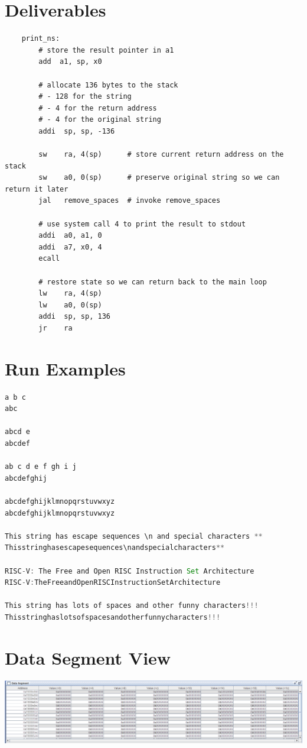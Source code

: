 \documentclass{article}
\begin{document}
\break
\section{Deliverables}
    \begin{lstlisting}
    print_ns:
        # store the result pointer in a1
        add  a1, sp, x0

        # allocate 136 bytes to the stack
        # - 128 for the string
        # - 4 for the return address
        # - 4 for the original string
        addi  sp, sp, -136

        sw    ra, 4(sp)      # store current return address on the stack
        sw    a0, 0(sp)      # preserve original string so we can return it later
        jal   remove_spaces  # invoke remove_spaces

        # use system call 4 to print the result to stdout
        addi  a0, a1, 0
        addi  a7, x0, 4
        ecall

        # restore state so we can return back to the main loop
        lw    ra, 4(sp)
        lw    a0, 0(sp)
        addi  sp, sp, 136
        jr    ra
    \end{lstlisting}

\section{Run Examples}
\begin{lstlisting}[language=Java]
a b c
abc

abcd e
abcdef

ab c d e f gh i j
abcdefghij

abcdefghijklmnopqrstuvwxyz
abcdefghijklmnopqrstuvwxyz

This string has escape sequences \n and special characters **
Thisstringhasescapesequences\nandspecialcharacters**

RISC-V: The Free and Open RISC Instruction Set Architecture
RISC-V:TheFreeandOpenRISCInstructionSetArchitecture

This string has lots of spaces and other funny characters!!!
Thisstringhaslotsofspacesandotherfunnycharacters!!!
\end{lstlisting}

\section{Data Segment View}
\includegraphics[width=15cm]{addr}
\end{document}
